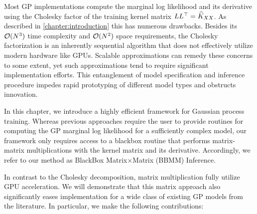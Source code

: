 Most GP implementations compute the marginal log likelihood and its derivative using the Cholesky factor of the training kernel matrix $L L^\top = \widehat{K}_{XX}$.
As described in \cref{chapter:introduction} this has numerous drawbacks.
Besides its $\bigo{N^3}$ time complexity and $\bigo{N^2}$ space requirements, the Cholesky factorization is an inherently sequential algorithm that does not effectively utilize modern hardware like GPUs.
Scalable approximations can remedy these concerns to some extent, yet such approximations tend to require significant implementation efforts.
This entanglement of model specification and inference procedure impedes rapid prototyping of different model types and obstructs innovation.

In this chapter, we introduce a highly efficient framework for Gaussian process training.
Whereas previous approaches require the user to provide routines for computing the GP marginal log likelihood for a sufficiently complex model,
our framework only requires access to a blackbox routine that performs matrix-matrix multiplications with the kernel matrix and its derivative.
Accordingly, we refer to our method as BlackBox Matrix$\times$Matrix (BBMM) Inference.

In contrast to the Cholesky decomposition, matrix multiplication fully utilize GPU acceleration.
We will demonstrate that this matrix approach also significantly eases implementation for a wide class of existing GP models from the literature.
In particular, we make the following contributions:

